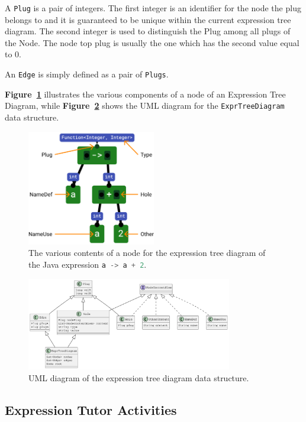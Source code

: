 \begin{chapterBody}
A \texttt{Plug} is a pair of integers. The first integer is an
identifier for the node the plug belongs to and it is guaranteed to
be unique within the current expression tree diagram. The second
integer is used to distinguish the Plug among all plugs of the Node.
The node top plug is usually the one which has the second value equal to 0.

An \texttt{Edge} is simply defined as a pair of \texttt{Plugs}.

\textbf{Figure~\ref{fig:bg-etd-node}} illustrates the various components
of a node of an Expression Tree Diagram, while
\textbf{Figure~\ref{fig:uml-etd}} shows the UML diagram for the
\texttt{ExprTreeDiagram} data structure.

\begin{figure}[ht]
    \centering
    \includegraphics[width=0.5\textwidth]{res/2/etd_contents.png}
    \caption{The various contents of a node for the expression tree diagram of
the Java expression \lstinline[language=Java]{a -> a + 2}.}
    \label{fig:bg-etd-node}
\end{figure}

\begin{figure}[ht]
\centering
\includegraphics[width=0.8\textwidth]{res/2/etd_uml.pdf}
\caption{UML diagram of the expression tree diagram data structure.}
\label{fig:uml-etd}
\end{figure}

\subsection{Expression Tutor Activities}


\end{chapterBody}
